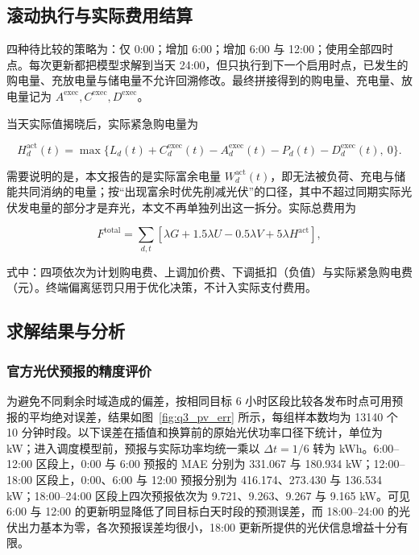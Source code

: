 \subsection{滚动执行与实际费用结算}

四种待比较的策略为：仅 0:00；增加 6:00；增加 6:00 与 12:00；使用全部四时点。每次更新都把模型求解到当天 24:00，但只执行到下一个启用时点，已发生的购电量、充放电量与储电量不允许回溯修改。最终拼接得到的购电量、充电量、放电量记为 $A^{\mathrm{exec}},C^{\mathrm{exec}},D^{\mathrm{exec}}$。

当天实际值揭晓后，实际紧急购电量为

\begin{equation}
  H_d^{\mathrm{act}}(t) = \max\{L_d(t) + C^{\mathrm{exec}}_d(t) - A^{\mathrm{exec}}_d(t) - P_d(t) - D^{\mathrm{exec}}_d(t),\ 0\}.
  \label{eq:q3_actual}
\end{equation}

需要说明的是，本文报告的是实际富余电量 $W^{\mathrm{act}}_d(t)$，即无法被负荷、充电与储能共同消纳的电量；按``出现富余时优先削减光伏''的口径，其中不超过同期实际光伏发电量的部分才是弃光，本文不再单独列出这一拆分。实际总费用为

\begin{equation}
  F^{\mathrm{total}} = \sum_{d,t}\left[\lambda G + 1.5\lambda U - 0.5\lambda V + 5\lambda H^{\mathrm{act}}\right],
  \label{eq:q3_total_cost}
\end{equation}

式中：四项依次为计划购电费、上调加价费、下调抵扣（负值）与实际紧急购电费（元）。终端偏离惩罚只用于优化决策，不计入实际支付费用。

\subsection{求解结果与分析}

\subsubsection{官方光伏预报的精度评价}

为避免不同剩余时域造成的偏差，按相同目标 6 小时区段比较各发布时点可用预报的平均绝对误差，结果如图~\ref{fig:q3_pv_err} 所示，每组样本数均为 13140 个 10 分钟时段。以下误差在插值和换算前的原始光伏功率口径下统计，单位为 kW；进入调度模型前，预报与实际功率均统一乘以 $\Delta t=1/6$ 转为 kWh。6:00--12:00 区段上，0:00 与 6:00 预报的 MAE 分别为 331.067 与 180.934 kW；12:00--18:00 区段上，0:00、6:00 与 12:00 预报分别为 416.174、273.430 与 136.534 kW；18:00--24:00 区段上四次预报依次为 9.721、9.263、9.267 与 9.165 kW。可见 6:00 与 12:00 的更新明显降低了同目标白天时段的预测误差，而 18:00--24:00 的光伏出力基本为零，各次预报误差均很小，18:00 更新所提供的光伏信息增益十分有限。

